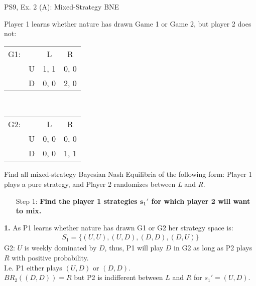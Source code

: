 \begin{frame}{PS9, Ex. 2 (A): Mixed-Strategy BNE}
    \begin{multicols}{2}
      Player 1 learns whether nature has drawn Game 1 or Game 2, but player 2 does not:
      \begin{table}
        \begin{tabular}{ll|c|c|}
          \multicolumn{1}{c}{G1:} & \multicolumn{1}{c}{} & \multicolumn{1}{c}{L} & \multicolumn{1}{c}{R} \\\cline{3-4}
          & U & 1, 1 & 0, 0 \\\cline{3-4}
          & D & 0, 0 & 2, 0 \\\cline{3-4}
        \end{tabular}\\\bigskip
        \begin{tabular}{ll|c|c|}
          \multicolumn{1}{c}{G2:} & \multicolumn{1}{c}{} & \multicolumn{1}{c}{L} & \multicolumn{1}{c}{R} \\\cline{3-4}
          & U & 0, 0 & 0, 0 \\\cline{3-4}
          & D & 0, 0 & 1, 1 \\\cline{3-4}
        \end{tabular}
      \end{table}
      Find all mixed-strategy Bayesian Nash Equilibria of the following form: Player 1 plays a pure strategy, and Player 2 randomizes between \textit{L} and \textit{R}.
      \begin{itemize}
        \item[Step 1:] \textbf{Find the player 1 strategies $\bm{s_1'}$ for which player 2 will want to mix.}
      \end{itemize}
      \vfill\null\columnbreak
      \textbf{1.} As P1 learns whether nature has drawn G1 or G2 her strategy space is:
      \begin{align*}
        S_1=\{(U,U),(U,D),(D,D),(D,U)\}
      \end{align*}
      G2: $U$ is weekly dominated by $D$, thus, P1 will play $D$ in G2 as long as P2 plays $R$ with positive probability.\\\medskip I.e. P1 either plays $(U,D)$ or $(D,D)$.\\\medskip
      $BR_2((D,D))=R$ but P2 is indifferent between $L$ and $R$ for $s_1'=(U,D)$.
      \vfill\null
    \end{multicols}
\end{frame}
